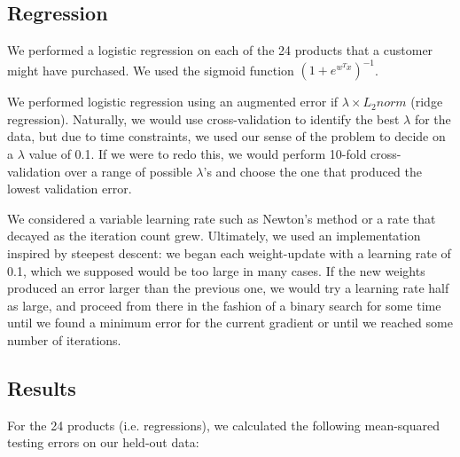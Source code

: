 \documentclass{article}
\begin{document}
\begin{spacing}{1}
\begin{large}
\subsection{Regression}

We performed a logistic regression on each of the 24 products that a customer might have purchased. We used the sigmoid function $(1+e^{w^Tx})^{-1}$.

We performed logistic regression using an augmented error if $\lambda \times L_2norm$ (ridge regression). Naturally, we would use cross-validation to identify the best $\lambda$ for the data, but due to time constraints, we used our sense of the problem to decide on a $\lambda$ value of 0.1. If we were to redo this, we would perform 10-fold cross-validation over a range of possible $\lambda$'s and choose the one that produced the lowest validation error.

We considered a variable learning rate such as Newton's method or a rate that decayed as the iteration count grew. Ultimately, we used an implementation inspired by steepest descent: we began each weight-update with a learning rate of 0.1, which we supposed would be too large in many cases. If the new weights produced an error larger than the previous one, we would try a learning rate half as large, and proceed from there in the fashion of a binary search for some time until we found a minimum error for the current gradient or until we reached some number of iterations.

\subsection{Results}

For the 24 products (i.e. regressions), we calculated the following mean-squared testing errors on our held-out data:


\end{large}
\end{spacing}
\end{document}
